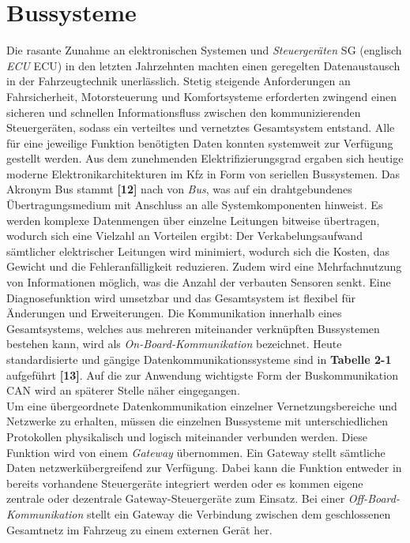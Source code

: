 \section{Bussysteme} \label{sec:Bussysteme}
Die rasante Zunahme an elektronischen Systemen und \emph{Steuergeräten} \acs{SG} (englisch \emph{\acl{ECU}} \acs{ECU}) in den letzten Jahrzehnten machten einen geregelten Datenaustausch in der Fahrzeugtechnik unerlässlich. Stetig steigende Anforderungen an Fahrsicherheit, Motorsteuerung und Komfortsysteme erforderten zwingend einen sicheren und schnellen Informationsfluss zwischen den kommunizierenden Steuergeräten, sodass ein verteiltes und vernetztes Gesamtsystem entstand. Alle für eine jeweilige Funktion benötigten Daten konnten systemweit zur Verfügung gestellt werden. Aus dem zunehmenden Elektrifizierungsgrad ergaben sich heutige moderne Elektronikarchitekturen im Kfz in Form von seriellen Bussystemen. Das Akronym \acs{Bus} stammt \textbf{[12]} nach von \emph{\acl{Bus}}, was auf ein drahtgebundenes Übertragungsmedium mit Anschluss an alle Systemkomponenten hinweist. Es werden komplexe Datenmengen über einzelne Leitungen bitweise übertragen, wodurch sich eine Vielzahl an Vorteilen ergibt: Der Verkabelungsaufwand sämtlicher elektrischer Leitungen wird minimiert, wodurch sich die Kosten, das Gewicht und die Fehleranfälligkeit reduzieren. Zudem wird eine Mehrfachnutzung von Informationen möglich, was die Anzahl der verbauten Sensoren senkt. Eine Diagnosefunktion wird umsetzbar und das Gesamtsystem ist flexibel für Änderungen und Erweiterungen. Die Kommunikation innerhalb eines Gesamtsystems, welches aus mehreren miteinander verknüpften Bussystemen bestehen kann, wird als \emph{On-Board-Kommunikation} bezeichnet. Heute standardisierte und gängige Datenkommunikationssysteme sind in \textbf{Tabelle 2-1} aufgeführt \textbf{[13]}. Auf die zur Anwendung wichtigste Form der Buskommunikation \acs{CAN} wird an späterer Stelle näher eingegangen.\\
Um eine übergeordnete Datenkommunikation einzelner Vernetzungsbereiche und Netzwerke zu erhalten, müssen die einzelnen Bussysteme mit unterschiedlichen Protokollen physikalisch und logisch miteinander verbunden werden. Diese Funktion wird von einem \emph{Gateway} übernommen. Ein Gateway stellt sämtliche Daten netzwerkübergreifend zur Verfügung. Dabei kann die Funktion entweder in bereits vorhandene Steuergeräte integriert werden oder es kommen eigene zentrale oder dezentrale Gateway-Steuergeräte zum Einsatz. Bei einer \emph{Off-Board-Kommunikation} stellt ein Gateway die Verbindung zwischen dem geschlossenen Gesamtnetz im Fahrzeug zu einem externen Gerät her.

